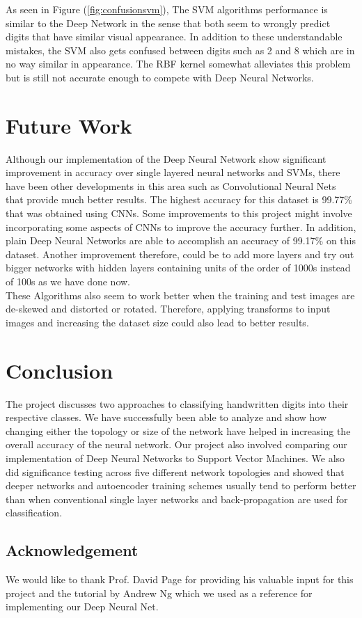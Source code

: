 \documentclass[10pt,twocolumn,letterpaper]{article}
\begin{document}
As seen in Figure (\ref{fig:confusionsvm}), The SVM algorithms performance is similar to the Deep Network in the sense that both seem to wrongly predict digits that have similar visual appearance. In addition to these understandable mistakes, the SVM also gets confused between digits such as 2 and 8 which are in no way similar in appearance. The RBF kernel somewhat alleviates this problem but is still not accurate enough to compete with Deep Neural Networks.

\section{Future Work}
Although our implementation of the Deep Neural Network show significant improvement in accuracy over single layered neural networks and SVMs, there have been other developments in this area such as Convolutional Neural Nets that provide much better results. The highest accuracy for this dataset is 99.77\% that was obtained using CNNs. Some improvements to this project might involve incorporating some aspects of CNNs to improve the accuracy further. In addition, plain Deep Neural Networks are able to accomplish an accuracy of 99.17\% on this dataset. Another improvement therefore, could be to add more layers and try out bigger networks with hidden layers containing units of the order of 1000s instead of 100s as we have done now.\\

These Algorithms also seem to work better when the training and test images are de-skewed and distorted or rotated. Therefore, applying transforms to input images and increasing the dataset size could also lead to better results.

\section{Conclusion}
The project discusses two approaches to classifying handwritten digits into their respective classes. We have successfully been able to analyze and show how changing either the topology or size of the network have helped in increasing the overall accuracy of the neural network. Our project also involved comparing our implementation of Deep Neural Networks to Support Vector Machines. We also did significance testing across five different network topologies and showed that deeper networks and autoencoder training schemes usually tend to perform better than when  conventional single layer networks and back-propagation are used for classification.
\subsection*{Acknowledgement}
We would like to thank Prof. David Page for providing his valuable input for this project and the tutorial by Andrew Ng \cite{ANg13t} which we used as a reference for implementing our Deep Neural Net.

{\small


}
\end{document}
